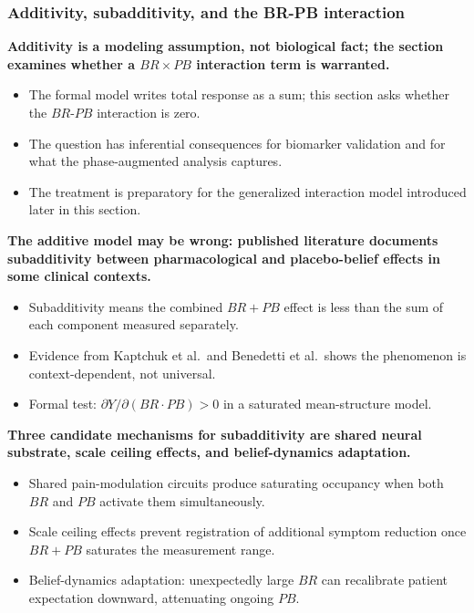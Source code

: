 \documentclass[
  11pt,
]{article}
\begin{document}
\subsubsection{Additivity, subadditivity, and the BR-PB interaction}\label{additivity-subadditivity-and-the-br-pb-interaction}

\textbf{Additivity is a modeling assumption, not biological fact; the section examines whether a $BR \times PB$ interaction term is warranted.}

\begin{itemize}\setlength{\itemsep}{2pt}\setlength{\parskip}{0pt}
\item The formal model writes total response as a sum; this section asks whether the $BR$-$PB$ interaction is zero.
\item The question has inferential consequences for biomarker validation and for what the phase-augmented analysis captures.
\item The treatment is preparatory for the generalized interaction model introduced later in this section.
\end{itemize}

\textbf{The additive model may be wrong: published literature documents subadditivity between pharmacological and placebo-belief effects in some clinical contexts.}

\begin{itemize}\setlength{\itemsep}{2pt}\setlength{\parskip}{0pt}
\item Subadditivity means the combined $BR + PB$ effect is less than the sum of each component measured separately.
\item Evidence from Kaptchuk et al.\ and Benedetti et al.\ shows the phenomenon is context-dependent, not universal.
\item Formal test: $\partial Y / \partial(BR \cdot PB) > 0$ in a saturated mean-structure model.
\end{itemize}

\textbf{Three candidate mechanisms for subadditivity are shared neural substrate, scale ceiling effects, and belief-dynamics adaptation.}

\begin{itemize}\setlength{\itemsep}{2pt}\setlength{\parskip}{0pt}
\item Shared pain-modulation circuits produce saturating occupancy when both $BR$ and $PB$ activate them simultaneously.
\item Scale ceiling effects prevent registration of additional symptom reduction once $BR + PB$ saturates the measurement range.
\item Belief-dynamics adaptation: unexpectedly large $BR$ can recalibrate patient expectation downward, attenuating ongoing $PB$.
\end{itemize}
\end{document}
